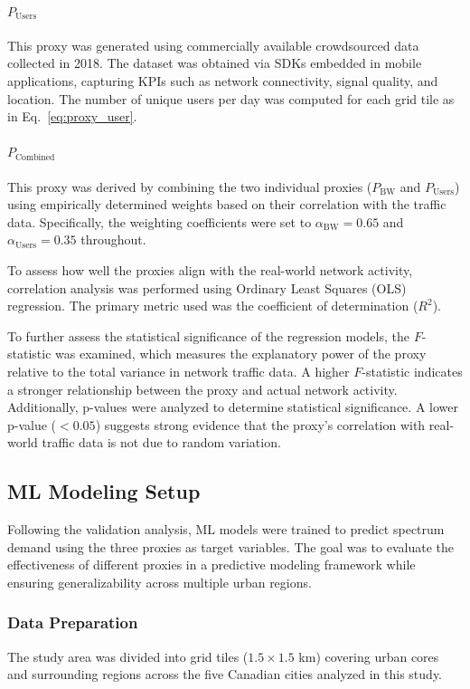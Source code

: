 \documentclass[conference]{IEEEtran}
\begin{document}
\paragraph{\(P_{\text{Users}}\)}
This proxy was generated using commercially available crowdsourced data collected in 2018. The dataset was obtained via SDKs embedded in mobile applications, capturing KPIs such as network connectivity, signal quality, and location. The number of unique users per day was computed for each grid tile as in Eq.~\eqref{eq:proxy_user}. 

\paragraph{\(P_{\text{Combined}}\)}
This proxy was derived by combining the two individual proxies (\(P_{\text{BW}}\) and \(P_{\text{Users}}\)) using empirically determined weights based on their correlation with the traffic data. Specifically, the weighting coefficients were set to \(\alpha_{\text{BW}} = 0.65\) and \(\alpha_{\text{Users}} = 0.35\) throughout.


To assess how well the proxies align with the real-world network activity, correlation analysis was performed using Ordinary Least Squares (OLS) regression. The primary metric used was the coefficient of determination (\(R^2\)).

To further assess the statistical significance of the regression models, the \(F\)-statistic was examined, which measures the explanatory power of the proxy relative to the total variance in network traffic data. A higher \(F\)-statistic indicates a stronger relationship between the proxy and actual network activity. Additionally, p-values were analyzed to determine statistical significance. A lower p-value (\(<0.05\)) suggests strong evidence that the proxy's correlation with real-world traffic data is not due to random variation.

\subsection{ML Modeling Setup}
Following the validation analysis, ML models were trained to predict spectrum demand using the three proxies as target variables. The goal was to evaluate the effectiveness of different proxies in a predictive modeling framework while ensuring generalizability across multiple urban regions.

\subsubsection{Data Preparation}
The study area was divided into grid tiles (\(1.5 \times 1.5\) km) covering urban cores and surrounding regions across the five Canadian cities analyzed in this study.
\end{document}
